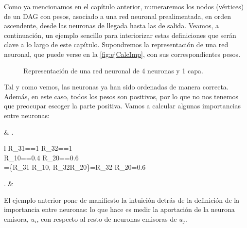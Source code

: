 \documentclass[12pt, a4paper, twoside]{book}
\numberwithin{equation}{section}
\theoremstyle{definition}
\newenvironment{ejem}
  {\pushQED{\qed}\renewcommand{\qedsymbol}{$\blacktriangleleft$}\ejemplo}
  {\popQED\endejemplo}
\theoremstyle{remark}
\theoremstyle{plain}
\begin{document}
	Como ya mencionamos en el capítulo anterior, numeraremos los nodos 
	(vértices) de un DAG con pesos, asociado a una red neuronal 
	prealimentada, en orden ascendente, desde las neuronas de llegada 
	hasta las de salida. Veamos, a continuación, un ejemplo sencillo para 
	interiorizar estas definiciones que serán clave a lo largo de este 
	capítulo.
	\begin{ejem}
		\label{ej:primerRel}	
		Supondremos la representación de una red neuronal, que puede 
		verse en la \autoref{fig:ejCalcImp}, con sus correspondientes 
		pesos.

		\begin{figure}[!htbp]
			\centering
			\caption{Representación de una red neuronal de 4 neuronas y 1 capa.}
			\label{fig:ejCalcImp}
		\end{figure}
		
		Tal y como vemos, las neuronas ya han sido ordenadas de manera 
		correcta. Además, en este caso, todos los pesos son positivos, 
		por lo que no nos tenemos que preocupar escoger la parte 
		positiva. Vamos a calcular algunas importancias entre 
		neuronas:			
		\begin{flalign*}
			& \left.
				\begin{array}{l}
					R_{31}==1 \hspace{0.5cm} R_{32}==1 \\[3pt]
					R_{10}==0.4 \hspace{0.55cm}  R_{20}==0.6 \\[3pt]
					=\max\{R_{31} \cdot R_{10}, R_{32}\cdot R_{20}\}=R_{32} \cdot R_{20}=0.6  
				\end{array}
			\right. & 
		\end{flalign*}
	\end{ejem}
	El ejemplo anterior pone de manifiesto la intuición detrás de la 
	definición de la importancia entre neuronas: lo que hace es medir 
	la aportación de la neurona emisora, $u_{i}$, con respecto al resto de 
	neuronas emisoras de $u_{j}$.
	
\end{document}
